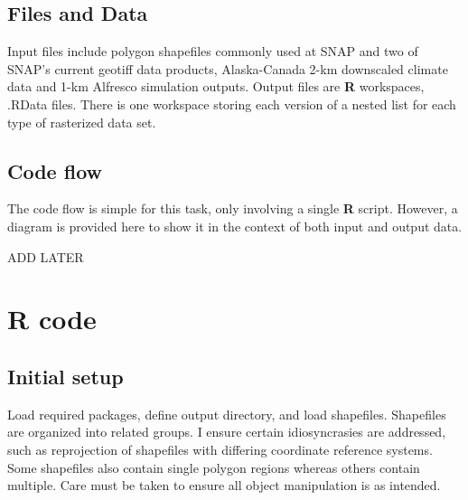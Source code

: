 \documentclass{article}\usepackage[]{graphicx}\usepackage[]{color}
\begin{document}
\subsection{Files and Data}
Input files include polygon shapefiles commonly used at SNAP and two of SNAP's current geotiff data products, Alaska-Canada 2-km downscaled climate data and 1-km Alfresco simulation outputs.
Output files are \textbf{R} workspaces, .RData files.
There is one workspace storing each version of a nested list for each type of rasterized data set.

\subsection{Code flow}
The code flow is simple for this task, only involving a single \textbf{R} script.
However, a diagram is provided here to show it in the context of both input and output data.

ADD LATER

\section{R code}

\subsection{Initial setup}

Load required packages, define output directory, and load shapefiles.
Shapefiles are organized into related groups.
I ensure certain idiosyncrasies are addressed, such as reprojection of shapefiles with differing coordinate reference systems.
Some shapefiles also contain single polygon regions whereas others contain multiple.
Care must be taken to ensure all object manipulation is as intended.
\end{document}
